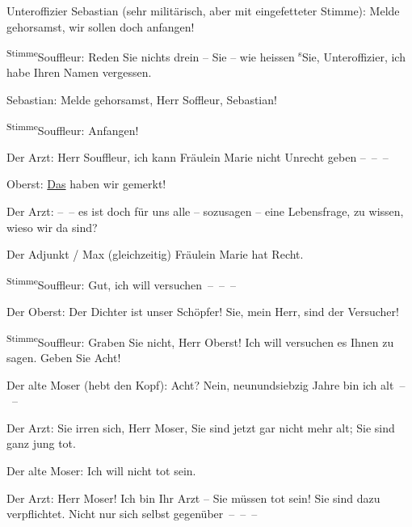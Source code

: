 \pstart
           Unteroffizier Sebastian (sehr militärisch, aber mit eingefetteter Stimme): Melde
               gehorsamst, wir sollen doch anfangen!\pend
           
\pstart
           \substVorne{}\textsuperscript{Stimme}{\allowbreak}\substDazwischen{}Souffleur\substHinten{}: Reden Sie nichts drein – Sie – wie heissen \substVorne{}\textsuperscript{s}\substDazwischen{}S\substHinten{}ie, Unteroffizier, ich habe Ihren Namen vergessen.\pend
           
\pstart
           {\pb}Sebastian: Melde gehorsamst, Herr
               Soffleur, Sebastian!\pend
           
\pstart
           \substVorne{}\textsuperscript{Stimme}{\allowbreak}\substDazwischen{}Souffleur\substHinten{}: Anfangen!\pend
           
\pstart
           Der Arzt: Herr Souffleur, ich kann Fräulein Marie nicht Unrecht geben – – –\pend
           
\pstart
           Oberst: \uline{Das} haben wir gemerkt!\pend
           
\pstart
           Der Arzt: – – es ist doch für uns alle – sozusagen – eine Lebensfrage, zu wissen,
               wieso wir da sind?\pend
           
\pstart
           Der Adjunkt / Max (gleichzeitig) Fräulein Marie hat Recht.\pend
           
\pstart
           \substVorne{}\textsuperscript{Stimme}{\allowbreak}\substDazwischen{}Souffleur\substHinten{}: Gut, ich will versuchen – – –\pend
           
\pstart
           Der Oberst: Der Dichter ist unser Schöpfer! Sie, mein Herr, sind der Versucher!\pend
           
\pstart
           \substVorne{}\textsuperscript{Stimme}{\allowbreak}\substDazwischen{}Souffleur\substHinten{}: Graben Sie nicht, Herr Oberst! Ich will versuchen es Ihnen zu sagen. Geben
               Sie Acht!\pend
           
\pstart
           Der alte Moser (hebt den Kopf): Acht? Nein, neunundsiebzig Jahre bin ich alt – –\pend
           
\pstart
           Der Arzt: Sie irren sich, Herr Moser, Sie sind jetzt gar nicht mehr alt; Sie sind
               ganz jung tot.\pend
           
\pstart
           Der alte Moser: Ich will nicht tot sein.\pend
           
\pstart
           Der Arzt: Herr Moser! Ich bin Ihr Arzt – Sie müssen tot sein! Sie sind dazu
               verpflichtet. Nicht nur sich selbst gegenüber – – –\pend
           
